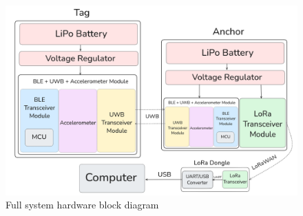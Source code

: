 \documentclass[conference]{IEEEtran}
\begin{document}
\begin{figure}
\includegraphics[scale=0.185]{Screenshot from 2024-10-18 21-37-02.png}
\caption{Full system hardware block diagram}
\end{figure}
\end{document}
